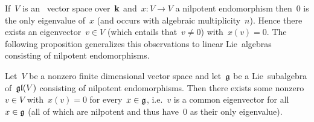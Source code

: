 \begin{remark}
  If~$V$ is an~{} vector space over~$\mathbf{k}$ and~$x \colon V \to V$ a nilpotent endomorphism then~$0$ is the only eigenvalue of~$x$ (and occurs with algebraic multiplicity~$n$).
  Hence there exists an eigenvector~$v \in V$ (which entails that~$v \neq 0$) with~$x(v) = 0$.
  The following proposition generalizes this observations to linear Lie~algebras consisting of nilpotent endomorphisms.
\end{remark}


\begin{proposition}
  \label{common eigenvector for nilpotent Lie algebras}
  Let~$V$ be a nonzero finite dimensional vector space and let~$\mathfrak{g}$ be a Lie~subalgebra of~$\mathfrak{gl}(V)$ consisting of nilpotent endomorphisms.
  Then there exists some nonzero~$v \in V$ with~$x(v) = 0$ for every~$x \in \mathfrak{g}$, i.e.~$v$ is a common eigenvector for all~$x \in \mathfrak{g}$ (all of which are nilpotent and thus have~$0$ as their only eigenvalue).
\end{proposition}


